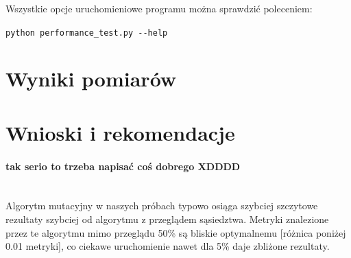\documentclass[11pt]{article}
\begin{document}
Wszystkie opcje uruchomieniowe programu można sprawdzić poleceniem:

 \texttt{python performance\_test.py -\--help}

\section{Wyniki pomiarów}



\section{Wnioski i rekomendacje}
\paragraph{ tak serio to trzeba napisać coś dobrego XDDDD\\\\}
Algorytm mutacyjny w naszych próbach typowo osiąga szybciej szczytowe rezultaty szybciej od algorytmu z przeglądem sąsiedztwa. Metryki znalezione przez te algorytmu mimo przeglądu 50\% są bliskie optymalnemu [różnica poniżej 0.01 metryki], co ciekawe uruchomienie nawet dla 5\% daje zbliżone rezultaty.
\end{document}
